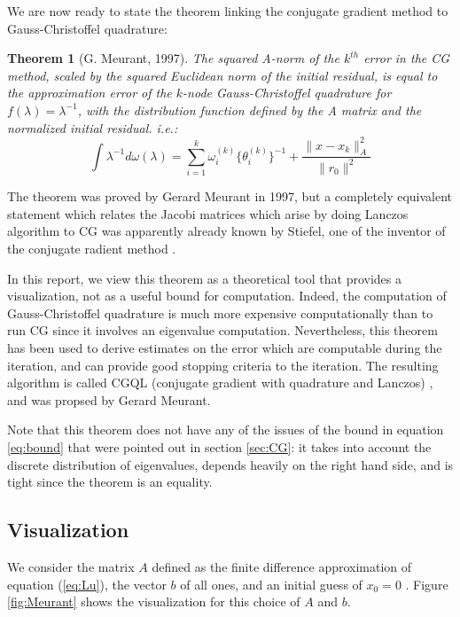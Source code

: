 \documentclass[10pt,a4paper]{article}
\newtheorem{theorem}{Theorem}
\begin{document}
We are now ready to state the theorem linking the conjugate gradient method to Gauss-Christoffel quadrature:
\vfil{}\vfilneg

\begin{theorem}[G. Meurant, 1997]
The squared A-norm of the $k^{th}$ error in the CG method, scaled by the squared Euclidean norm of the initial residual, is equal to the approximation error of the $k$-node Gauss-Christoffel quadrature for $f(\lambda) = \lambda^{-1}$, with the distribution function defined by the A matrix and the normalized initial residual.
i.e.:
\begin{equation}
\int \lambda^{-1} d\omega(\lambda) = \sum_{i=1}^{k} \omega_i^{(k)} \{ \theta_i^{(k)} \}^{-1}+ \frac{\| x- x_k \|^2_A}{\| r_0 \|^2}  
\end{equation}
\end{theorem}




The theorem was proved by Gerard Meurant in 1997, but a completely equivalent statement which relates the Jacobi matrices which arise by doing Lanczos algorithm to CG was apparently already known by Stiefel, one of the inventor of the conjugate radient method \cite{golub2009matrices}. 

In this report, we view this theorem as a theoretical tool that provides a visualization, not as a useful bound for computation. Indeed, the computation of Gauss-Christoffel quadrature is much more expensive computationally than to run CG since it involves an eigenvalue computation. Nevertheless, this theorem has been used to derive estimates on the error which are computable during the iteration, and can provide good stopping criteria to the iteration. The resulting algorithm is called CGQL (conjugate gradient with quadrature and Lanczos) \cite{meurant1997computation}, and was propsed by Gerard Meurant.


Note that this theorem does not have any of the issues of the bound in equation \ref{eq:bound} that were pointed out in section \ref{sec:CG}: it takes into account the discrete distribution of eigenvalues, depends heavily on the right hand side, and is tight since the theorem is an equality.
\subsection{Visualization}

We consider the matrix $A$ defined as the finite difference approximation of  equation (\ref{eq:Lu}), the vector $b$ of all ones, and an initial guess of $x_0 =0 $ . Figure \ref{fig:Meurant} shows the visualization for this choice of $A$ and $b$.
\end{document}
